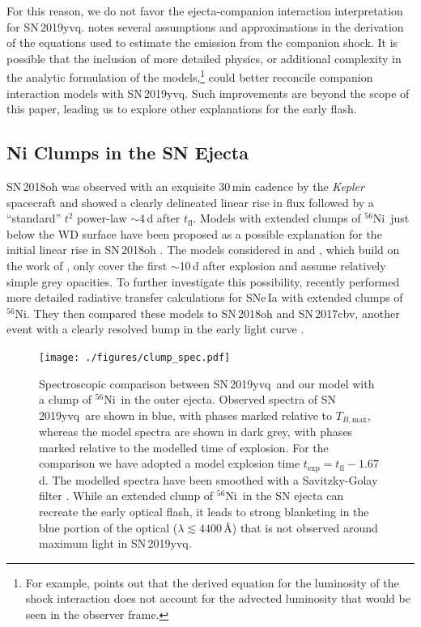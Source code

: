 \documentclass[twocolumn]{aastex63}
\newcommand{\tfl}{$t_\mathrm{fl}$}
\newcommand{\tbmax}{$T_{B,\mathrm{max}}$}
\newcommand{\radni}{$^{56}$Ni}
\newcommand{\sn}{SN\,2019yvq}
\begin{document}
For this reason, we do not favor the ejecta-companion interaction
interpretation for \sn. \citet{Kasen10a} notes several assumptions and
approximations in the derivation of the equations used to estimate the
emission from the companion shock. It is possible that the inclusion of more
detailed physics, or additional complexity in the analytic formulation of the
models,\footnote{For example, \citet{Kasen10a} points out that the derived
equation for the luminosity of the shock interaction does not account for the
advected luminosity that would be seen in the observer frame.} could better
reconcile companion interaction models with \sn. Such improvements are beyond
the scope of this paper, leading us to explore other explanations for the
early flash.

\subsection{Ni Clumps in the SN Ejecta}

SN\,2018oh was observed with an exquisite 30\,min cadence by the
\textit{Kepler} spacecraft and showed a clearly delineated linear rise in flux
followed by a ``standard'' $t^2$ power-law $\sim$4\,d after \tfl. Models with
extended clumps of \radni\ just below the WD surface have been proposed as a
possible explanation for the initial linear rise in SN\,2018oh
\citep{Shappee19,Dimitriadis19}. The models considered in \citet{Shappee19}
and \citet{Dimitriadis19}, which build on the work of \citet{Piro16}, only
cover the first $\sim$10\,d after explosion and assume relatively simple grey
opacities. To further investigate this possibility, \citet{Magee20a} recently
performed more detailed radiative transfer calculations for SNe\,Ia with
extended clumps of \radni. They then compared these models to SN\,2018oh and
SN\,2017cbv, another event with a clearly resolved bump in the early light
curve \citep{Hosseinzadeh17}.

\begin{figure}
    \centering
    \texttt{[image: ./figures/clump\_spec.pdf]}
    \caption{Spectroscopic comparison between \sn\ and our model with a clump
    of \radni\ in the outer ejecta. Observed spectra of \sn\ are shown in
    blue, with phases marked relative to \tbmax, whereas the model spectra are
    shown in dark grey, with phases marked relative to the modelled time of
    explosion. For the comparison we have adopted a model explosion time
    $t_\mathrm{exp} = t_\mathrm{fl} - 1.67$\,d. The modelled spectra have been
    smoothed with a Savitzky-Golay filter \citep{Savitzky64}. While an
    extended clump of \radni\ in the SN ejecta can recreate the early optical
    flash, it leads to strong blanketing in the blue portion of the optical
    ($\lambda \lesssim 4400$\,\AA) that is not observed around maximum light
    in \sn. }
    \label{fig:Ni_bullet}
\end{figure}
\end{document}
